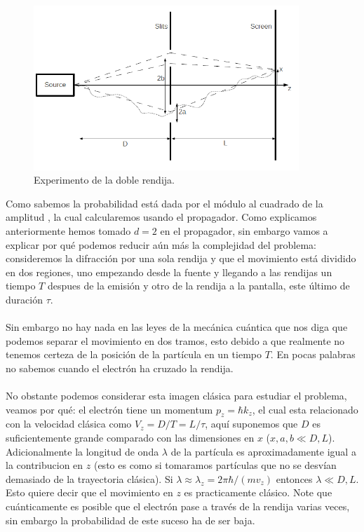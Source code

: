\begin{figure}[h]
\centering
\includegraphics[width=10cm]{Imagenes/Fig8}
\caption[Esquema del experimento de la doble rendija en 2D]{Experimento de la doble rendija.}
\end{figure}
Como sabemos la probabilidad está dada por el módulo al cuadrado de la amplitud , la cual calcularemos usando el propagador. Como explicamos anteriormente hemos tomado $d=2$ en el propagador, sin embargo vamos a explicar por qué podemos reducir aún más la complejidad del problema: consideremos la difracción por una sola rendija y que el movimiento está dividido en dos regiones, uno empezando desde la fuente y llegando a las rendijas un tiempo $T$ despues de la emisión y otro de la rendija a la pantalla, este último de duración $\tau$.
\\
\\
Sin embargo no hay nada en las leyes de la mecánica cuántica que nos diga que podemos separar el movimiento en dos tramos, esto debido a que realmente no tenemos certeza de la posición de la partícula en un tiempo $T$. En pocas palabras no sabemos cuando el electrón ha cruzado la rendija.
\\
\\
No obstante podemos considerar esta imagen clásica para estudiar el problema, veamos por qué: el electrón tiene un momentum $p_z=\hbar k_z$, el cual esta relacionado con la velocidad clásica como $V_z=D/T=L/\tau$, aquí suponemos que $D$ es suficientemente grande comparado con las dimensiones en $x$ ($x,a,b\ll D,L$). Adicionalmente la longitud de onda $\lambda$ de la partícula es aproximadamente igual a la contribucion en $z$ (esto es como si tomaramos partículas que no se desvían demasiado de la trayectoria clásica). Si $\lambda \approx \lambda_z=2\pi\hbar/(mv_z)$ entonces $\lambda \ll D,L$. Esto quiere decir que el movimiento en $z$ es practicamente clásico. Note que cuánticamente es posible que el electrón pase a través de la rendija varias veces, sin embargo la probabilidad de este suceso ha de ser baja.

